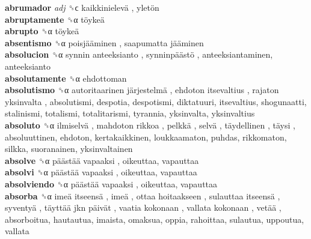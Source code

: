 \textbf{abrumador} \emph{adj}  ␝ϲ   kaikkinielevä ,  yletön   \\
\textbf{abruptamente} ␝α   töykeä   \\
\textbf{abrupto} ␝α   töykeä   \\
\textbf{absentismo} ␝α   poisjääminen ,  saapumatta jääminen   \\
\textbf{absolucion} ␝α   synnin anteeksianto ,  synninpäästö , anteeksiantaminen, anteeksianto  \\
\textbf{absolutamente} ␝α  ehdottoman  \\
\textbf{absolutismo} ␝α   autoritaarinen järjestelmä ,  ehdoton itsevaltius ,  rajaton yksinvalta , absolutismi, despotia, despotismi, diktatuuri, itsevaltius, shogunaatti, stalinismi, totalismi, totalitarismi, tyrannia, yksinvalta, yksinvaltius  \\
\textbf{absoluto} ␝α   ilmiselvä ,  mahdoton  rikkoa ,  pelkkä ,  selvä ,  täydellinen ,  täysi , absoluuttinen, ehdoton, kertakaikkinen, loukkaamaton, puhdas, rikkomaton, silkka, suoranainen, yksinvaltainen  \\
\textbf{absolve} ␝α   päästää vapaaksi , oikeuttaa, vapauttaa  \\
\textbf{absolvi} ␝α   päästää vapaaksi , oikeuttaa, vapauttaa  \\
\textbf{absolviendo} ␝α   päästää vapaaksi , oikeuttaa, vapauttaa  \\
\textbf{absorba} ␝α   imeä itseensä ,  imeä ,  ottaa hoitaakseen ,  sulauttaa itseensä ,  syventyä ,  täyttää jkn päivät ,  vaatia kokonaan ,  vallata kokonaan ,  vetää , absorboitua, hautautua, imaista, omaksua, oppia, rahoittaa, sulautua, uppoutua, vallata  \\
